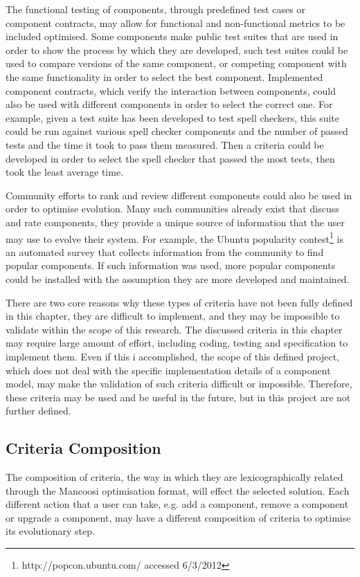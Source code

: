The functional testing of components, through predefined test cases or component contracts, may allow for functional and non-functional metrics to be included optimised.
Some components make public test suites that are used in order to show the process by which they are developed,
such test suites could be used to compare versions of the same component, or competing component with the same functionality in order to select the best component.
Implemented component contracts, which verify the interaction between components, could also be used with different components in order to select the correct one. 
For example, given a test suite has been developed to test spell checkers, 
this suite could be run against various spell checker components and the number of passed tests and the time it took to pass them measured.
Then a criteria could be developed in order to select the spell checker that passed the most tests, then took the least average time.

Community efforts to rank and review different components could also be used in order to optimise evolution.
Many such communities already exist that discuss and rate components, they provide a unique source of information that the user may use to evolve their system.
For example, the Ubuntu popularity contest\footnote{http://popcon.ubuntu.com/ accessed 6/3/2012} is an automated survey that collects information from the community to find popular components.
If such information was used, more popular components could be installed with the assumption they are more developed and maintained.

There are two core reasons why these types of criteria have not been fully defined in this chapter,
they are difficult to implement, and they may be impossible to validate within the scope of this research.
The discussed criteria in this chapter may require large amount of effort, including coding, testing and specification to implement them.
Even if this i accomplished, the scope of this defined project, which does not deal with the specific implementation details of a component model,
may make the validation of such criteria difficult or impossible.
Therefore, these criteria may be used and be useful in the future, but in this project are not further defined.

\subsection{Criteria Composition}
The composition of criteria, the way in which they are lexicographically related through the Mancoosi optimisation format,
will effect the selected solution.
Each different action that a user can take, e.g. add a component, remove a component or upgrade a component, may have a different composition of criteria to optimise its evolutionary step.

